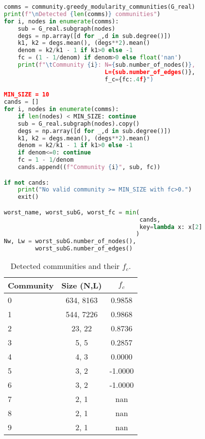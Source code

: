 \documentclass{article}
\begin{document}
\begin{lstlisting}[language=Python, caption={Finding the worst community.}, label={lst:worst_community}]
comms = community.greedy_modularity_communities(G_real)
print(f"\nDetected {len(comms)} communities")
for i, nodes in enumerate(comms):
    sub = G_real.subgraph(nodes)
    degs = np.array([d for _,d in sub.degree()])
    k1, k2 = degs.mean(), (degs**2).mean()
    denom = k2/k1 - 1 if k1>0 else -1
    fc = (1 - 1/denom) if denom>0 else float('nan')
    print(f"\tCommunity {i}: N={sub.number_of_nodes()}, 
                             L={sub.number_of_edges()}, 
                             f_c={fc:.4f}")

MIN_SIZE = 10
cands = []
for i, nodes in enumerate(comms):
    if len(nodes) < MIN_SIZE: continue
    sub = G_real.subgraph(nodes).copy()
    degs = np.array([d for _,d in sub.degree()])
    k1, k2 = degs.mean(), (degs**2).mean()
    denom = k2/k1 - 1 if k1>0 else -1
    if denom<=0: continue
    fc = 1 - 1/denom
    cands.append((f"Community {i}", sub, fc))

if not cands:
    print("No valid community >= MIN_SIZE with fc>0.")
    exit()

worst_name, worst_subG, worst_fc = min(
                                       cands, 
                                       key=lambda x: x[2]
                                      )
Nw, Lw = worst_subG.number_of_nodes(), 
         worst_subG.number_of_edges()
\end{lstlisting}

\begin{table}[H]
  \centering
  \caption{Detected communities and their $f_c$.}\label{tab:comms:fc}
  \begin{tabular}{lcc}
    \toprule
    Community & Size (N,L) & $f_c$ \\
    \midrule
      0 & 634, 8163  & 0.9858 \\
      1 & 544, 7226  & 0.9868 \\
      2 & 23, 22     & 0.8736 \\
      3 & 5, 5       & 0.2857 \\
      4 & 4, 3       & 0.0000 \\
      5 & 3, 2       & -1.0000 \\
      6 & 3, 2       & -1.0000 \\
      7 & 2, 1       & nan \\
      8 & 2, 1       & nan \\
      9 & 2, 1       & nan \\
  \end{tabular}
\end{table}
\end{document}
